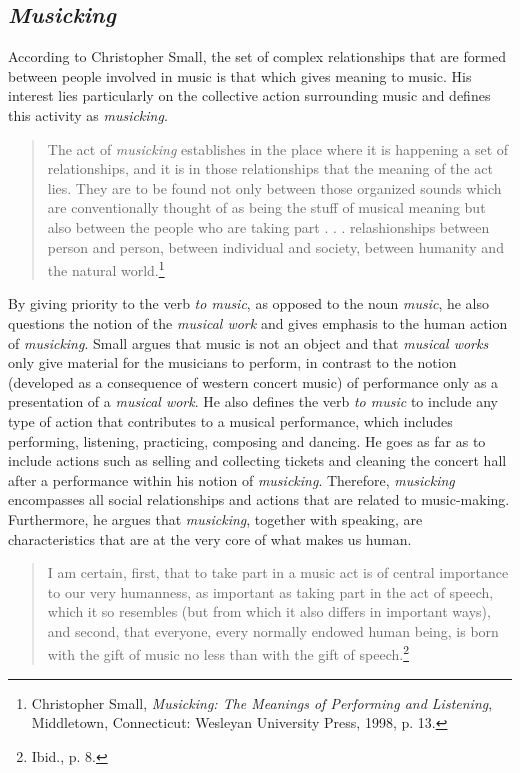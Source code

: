 \subsection{\emph{Musicking}}

According to Christopher Small, the set of complex relationships that are formed between people involved in music is that which gives meaning to music. His interest lies particularly on the collective action surrounding music and defines this activity as \emph{musicking}. 
\begin{quote}
The act of \emph{musicking} establishes in the place where it is happening a set of relationships, and it is in those relationships that the meaning of the act lies. They are to be found not only between those organized sounds which are conventionally thought of as being the stuff of musical meaning but also between the people who are taking part . . . relashionships between person and person, between individual and society, between humanity and the natural world.\footnote{Christopher Small, \emph{Musicking: The Meanings of Performing and Listening}, Middletown, Connecticut: Wesleyan University Press, 1998, p. 13.}
\end{quote}
By giving priority to the verb \emph{to music}, as opposed to the noun \emph{music}, he also questions the notion of the \emph{musical work} and gives emphasis to the human action of \emph{musicking}. Small argues that music is not an object and that \emph{musical works} only give material for the musicians to perform, in contrast to the notion (developed as a consequence of western concert music) of performance only as a presentation of a \emph{musical work}. He also defines the verb \emph{to music} to include any type of action that contributes to a musical performance, which includes performing, listening, practicing, composing and dancing. He goes as far as to include actions such as selling and collecting tickets and cleaning the concert hall after a performance within his notion of \emph{musicking}. Therefore, \emph{musicking} encompasses all social relationships and actions that are related to music-making. Furthermore, he argues that \emph{musicking}, together with speaking, are characteristics that are at the very core of what makes us human.
 \begin{quote}
I am  certain, first, that to take part in a music act is of central importance to our very humanness, as important as taking part in the act of speech, which it so resembles (but from which it also differs in important ways), and second, that everyone, every normally endowed human being, is born with the gift of music no less than with the gift of speech.\footnote{Ibid., p. 8.}
\end{quote} 
